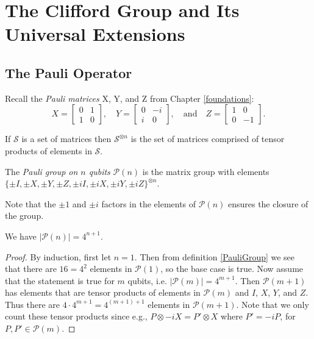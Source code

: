 \documentclass[12pt]{dalthesis}
\begin{document}
\chapter{The Clifford Group and Its Universal Extensions}
\label{chap Stab}
\section{The Pauli Operator}

Recall the \emph{Pauli matrices} X, Y, and Z from Chapter \ref{foundations}:
  \[
  X= \begin{bmatrix}
    0 & 1 \\
    1 & 0
  \end{bmatrix}, \quad
  Y = \begin{bmatrix}
  0 & -i \\
  i & 0
  \end{bmatrix}, \quad \mbox{and} \quad
  Z = \begin{bmatrix}
  1 & 0 \\
  0 & -1
  \end{bmatrix}.
  \]

If $\mathcal{S}$ is a set of matrices then $\mathcal{S}^{\otimes n}$ is the set of matrices comprised of tensor products of elements in $\mathcal{S}$.

\begin{definition}
\label{PauliGroup}
The \emph{Pauli group on $n$ qubits} $\mathcal{P}(n)$ is the matrix group with elements $\{ \pm I, \pm X, \pm Y, \pm Z, \pm iI, \pm iX, \pm iY, \pm iZ \}^{\otimes n}$.
\end{definition}

Note that the $\pm 1$ and $\pm i$ factors in the elements of $\mathcal{P}(n)$ ensures the closure of the group.


\begin{proposition}
We have $|\mathcal{P}(n)|=4^{n+1}$.
\end{proposition}

\begin{proof}
By induction, first let $n=1$. Then from definition \ref{PauliGroup} we see that there are $16 = 4^2$ elements in $\mathcal{P}(1)$, so the base case is true. Now assume that the statement is true for $m$ qubits, i.e. $|\mathcal{P}(m)| = 4^{m+1}$. Then $\mathcal{P}(m+1)$ has elements that are tensor products of elements in $\mathcal{P}(m)$ and $I$, $X$, $Y$, and $Z$. Thus there are $4 \cdot 4^{m+1} = 4^{(m+1)+1}$ elements in $\mathcal{P}(m+1)$. Note that we only count these tensor products since e.g., $P \otimes -iX = P' \otimes X$ where $P' = -iP$, for $P, P' \in \mathcal{P}(m)$.
\end{proof}
\end{document}
